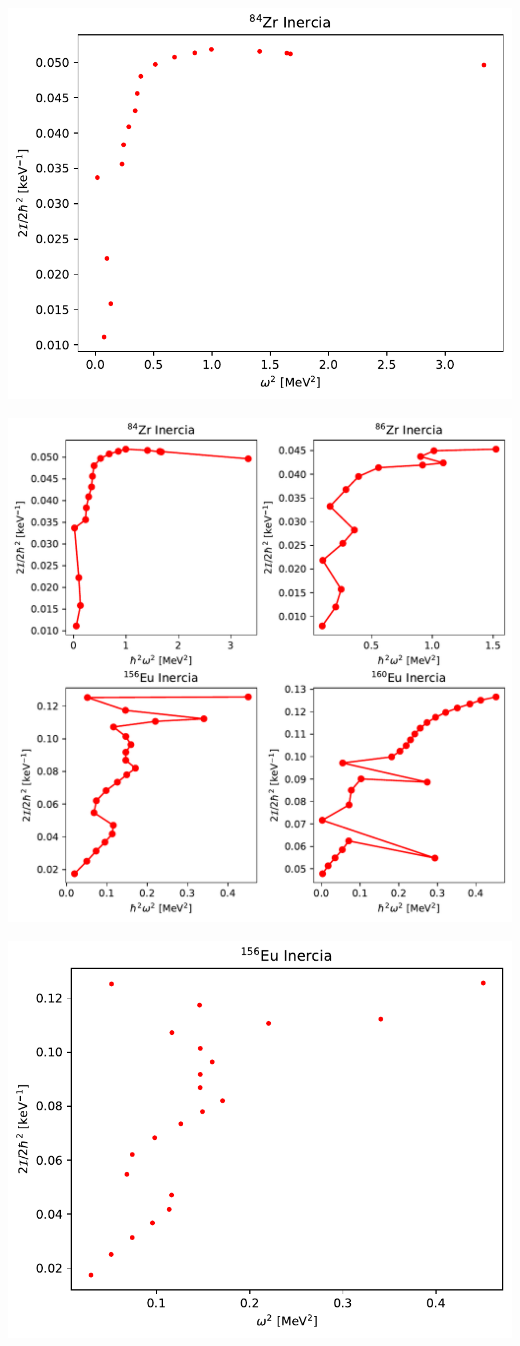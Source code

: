 \begin{texercise}
    \begin{center}
        \includegraphics[width=0.6\linewidth]{Cuerpo/Boletin_01/84Zr_inercia.pdf}
    \end{center}
    \begin{center}
        \includegraphics[width=0.6\linewidth]{Cuerpo/Boletin_01/86Zr_inercia.pdf}
    \end{center}
    \begin{center}
        \includegraphics[width=0.6\linewidth]{Cuerpo/Boletin_01/156Eu_inercia.pdf}
    \end{center}
    \begin{center}

\end{center}
\end{texercise}
